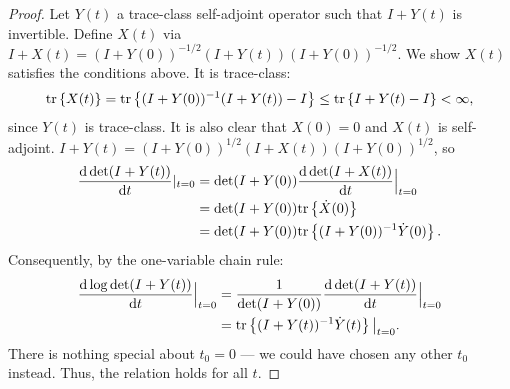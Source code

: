 \documentclass{siamonline220329}
\begin{document}
\begin{proof}
  Let $Y(t)$ a trace-class self-adjoint operator such that 
  $I+Y(t)$ is invertible.
  Define $X(t)$ via $I+X(t) = (I+Y(0))^{-1/2} (I+Y(t)) (I+Y(0))^{-1/2}$. 
  We show $X(t)$ satisfies the conditions above. It is trace-class:
  \begin{align*}
    \textup{tr}\left \{X(t) \right \} = \textup{tr}\left \{(I+Y(0))^{-1} (I+Y(t)) - I \right \}
    \leq \textup{tr}\left \{I+Y(t) - I \right \}< \infty,
  \end{align*}
  since $Y(t)$ is trace-class. It is also clear that
  $X(0) = 0$ and $X(t)$ is self-adjoint.
  $I+Y(t) = (I+Y(0))^{1/2}(I+X(t))(I+Y(0))^{1/2}$, so
  \begin{align*}
    \frac{\text{\textup{d}} \det (I+Y(t))}{\text{\textup{d}} t}|_{t=0} 
    &= \det (I+Y(0))\frac{\text{\textup{d}} \det (I+X(t))}{\text{\textup{d}} t}\Big |_{t=0} \\
    &= \det (I+Y(0)) \textup{tr}\left \{\dot{X}(0) \right \} \\
    &= \det (I+Y(0)) \textup{tr}\left \{(I+Y(0))^{-1} \dot{Y}(0) \right \}.
  \end{align*}
  Consequently, by the one-variable chain rule:
  \begin{align*}
    \frac{\text{\textup{d}} \log \det (I+Y(t))}{\text{\textup{d}} t}\Big |_{t=0} &=
    \frac{1}{\det (I+Y(0))}\frac{\text{\textup{d}} \det (I+Y(t))}{\text{\textup{d}} t}\Big |_{t=0} \\ 
    &= \textup{tr}\left \{ (I+Y(t))^{-1} \dot{Y}(t) \right \} \big |_{t=0}.
  \end{align*}
  There is nothing special about $t_0 = 0$ --- we could have chosen
  any other $t_0$ instead. Thus, the relation holds for all $t$.
\end{proof}
\end{document}
